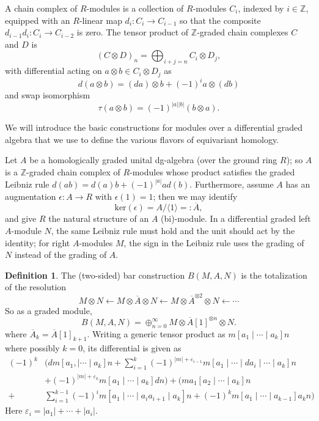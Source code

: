 \documentclass{memo-l}
\theoremstyle{definition}
\newtheorem{definition}[theorem]{Definition}
\theoremstyle{remark}
\numberwithin{section}{chapter}
\numberwithin{equation}{chapter}
\begin{document}
A chain complex of $R$-modules is a collection of $R$-modules $C_i$, indexed by $i \in \mathbb Z$, equipped with an $R$-linear map $d_i: C_i \to C_{i-1}$ so that the composite $d_{i-1} d_i: C_i \to C_{i-2}$ is zero. The tensor product of $\mathbb Z$-graded chain complexes $C$ and $D$ is $$(C \otimes D)_n = \bigoplus_{i+j = n} C_i \otimes D_j,$$ with differential acting on $a \otimes b \in C_i \otimes D_j$ as $$d(a \otimes b) = (d a) \otimes b + (-1)^{i} a \otimes (db)$$ and swap isomorphism $$\tau(a \otimes b) = (-1)^{|a||b|} (b \otimes a).$$

We will introduce the basic constructions for modules over a differential graded algebra that we use to define the various flavors of equivariant homology. 

Let $A$ be a homologically graded unital dg-algebra (over the ground ring $R$); so $A$ is a $\mathbb Z$-graded chain complex of $R$-modules whose product satisfies the graded Leibniz rule $d(ab) = d(a)b + (-1)^{|a|} ad(b)$. Furthermore, assume $A$ has an augmentation $\epsilon: A \to R$ with $\epsilon(1) = 1$; then we may identify 
$$\text{ker}(\epsilon) = A/\langle 1\rangle =: \overline A,$$
and give $R$ the natural structure of an $A$ (bi)-module. In a differential graded left $A$-module $N$, the same Leibniz rule must hold and the unit should act by the identity; for right $A$-modules $M$, the sign in the Leibniz rule uses the grading of $N$ instead of the grading of $A$.

\begin{definition}\label{bardef}The (two-sided) bar construction $B(M,A,N)$ is the totalization of the resolution 
$$M \otimes N \leftarrow M \otimes \overline A \otimes N \leftarrow  M \otimes \overline A^{\otimes 2} \otimes N \leftarrow \cdots$$ 
So as a graded module, 
$$B(M,A,N) = \oplus_{n=0}^\infty M \otimes \overline A[1]^{\otimes n} \otimes N.$$ 
where $\overline A_k = \overline A[1]_{k+1}$. Writing a generic tensor product as $m \left[a_1 \mid \cdots \mid a_k\right] n$ where possibly $k = 0$, its differential is given as
\begin{align*}(-1)^k &\Bigg(dm [a_1, \mid \cdots \mid a_k ] n + \sum_{i=1}^k (-1)^{|m|+\varepsilon_{i-1}} m\left[a_1\mid \cdots \mid da_i \mid \cdots \mid a_k\right]n \\
&+ (-1)^{|m|+\varepsilon_k} m\left[a_1\mid \cdots \mid a_k\right] dn \Bigg)+ \Bigg(ma_1 [a_2 \mid \cdots \mid a_k] n \\
+&\sum_{i=1}^{k-1} (-1)^i m \left[a_1 \mid \cdots \mid a_i a_{i+1} \mid a_k\right] n + (-1)^k m \left[a_1 \mid \cdots \mid a_{k-1}\right] a_k n\Bigg)\
\end{align*}
Here $\varepsilon_i = |a_1| + \cdots + |a_i|$.
\end{definition} 
\end{document}
